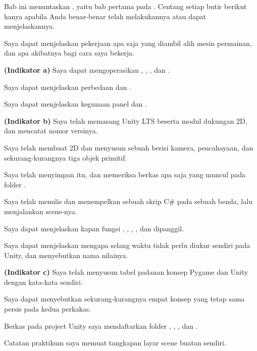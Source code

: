 
Bab ini menuntaskan , yaitu bab pertama pada . Centang
setiap butir berikut hanya apabila Anda benar-benar telah melakukannya atau
dapat menjelaskannya.

\begin{checklistbox}
\begin{checklist}
  \item Saya dapat menjelaskan pekerjaan apa saja yang diambil alih mesin
        permainan, dan apa akibatnya bagi cara saya bekerja.
  \item {\bfseries (Indikator a)} Saya dapat mengoperasikan
        , , , dan
        .
  \item Saya dapat menjelaskan perbedaan  dan
        .
  \item Saya dapat menjelaskan kegunaan panel  dan
        .
  \item {\bfseries (Indikator b)} Saya telah memasang Unity LTS beserta modul
        dukungan 2D, dan mencatat nomor versinya.
  \item Saya telah membuat  2D dan menyusun sebuah
         berisi kamera, pencahayaan, dan sekurang-kurangnya
        tiga objek primitif.
  \item Saya telah menyimpan  itu, dan memeriksa berkas apa saja
        yang muncul pada folder .
  \item Saya telah menulis dan menempelkan sebuah skrip C\# pada sebuah benda,
        lalu menjalankan scene-nya.
  \item Saya dapat menjelaskan kapan fungsi , ,
        , , dan  dipanggil.
  \item Saya dapat menjelaskan mengapa selang waktu tidak perlu diukur sendiri
        pada Unity, dan menyebutkan nama nilainya.
  \item {\bfseries (Indikator c)} Saya telah menyusun tabel padanan konsep
        Pygame dan Unity dengan kata-kata sendiri.
  \item Saya dapat menyebutkan sekurang-kurangnya empat konsep yang tetap sama
        persis pada kedua perkakas.
  \item Berkas  pada project Unity saya mendaftarkan folder
        , , , dan .
  \item Catatan praktikum saya memuat tangkapan layar scene buatan sendiri.
\end{checklist}
\end{checklistbox}
